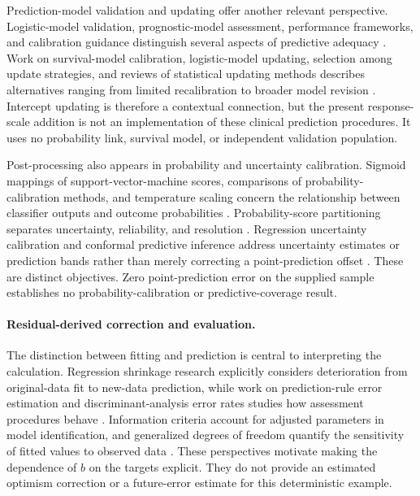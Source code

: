 \documentclass[11pt]{article}
\begin{document}
Prediction-model validation and updating offer another relevant perspective. Logistic-model validation, prognostic-model assessment, performance frameworks, and calibration guidance distinguish several aspects of predictive adequacy \cite{Miller1991ValidationTechniques,Harrell1996MultivariablePrognostic,Steyerberg2009AssessingPerformance,Initiative2019CalibrationAchilles}. Work on survival-model calibration, logistic-model updating, selection among update strategies, and reviews of statistical updating methods describes alternatives ranging from limited recalibration to broader model revision \cite{Houwelingen2000ValidationCalibration,Steyerberg2004ValidationUpdating,Vergouwe2016ClosedTesting,Su2016ReviewStatistical}. Intercept updating is therefore a contextual connection, but the present response-scale addition is not an implementation of these clinical prediction procedures. It uses no probability link, survival model, or independent validation population.

Post-processing also appears in probability and uncertainty calibration. Sigmoid mappings of support-vector-machine scores, comparisons of probability-calibration methods, and temperature scaling concern the relationship between classifier outputs and outcome probabilities \cite{Platt1999ProbabilisticOutputs,Niculescumizil2005PredictingGood,Guo2017CalibrationModern}. Probability-score partitioning separates uncertainty, reliability, and resolution \cite{Murphy1973NewVector}. Regression uncertainty calibration and conformal predictive inference address uncertainty estimates or prediction bands rather than merely correcting a point-prediction offset \cite{Kuleshov2018AccurateUncertainties,Levi2022EvaluatingCalibrating,Lei2018DistributionfreePredictive}. These are distinct objectives. Zero point-prediction error on the supplied sample establishes no probability-calibration or predictive-coverage result.

\paragraph{Residual-derived correction and evaluation.}
The distinction between fitting and prediction is central to interpreting the calculation. Regression shrinkage research explicitly considers deterioration from original-data fit to new-data prediction, while work on prediction-rule error estimation and discriminant-analysis error rates studies how assessment procedures behave \cite{Copas1983RegressionPrediction,Efron1983EstimatingError,Lachenbruch1968EstimationError}. Information criteria account for adjusted parameters in model identification, and generalized degrees of freedom quantify the sensitivity of fitted values to observed data \cite{Akaike1974NewLook,Ye1998MeasuringCorrecting}. These perspectives motivate making the dependence of $b$ on the targets explicit. They do not provide an estimated optimism correction or a future-error estimate for this deterministic example.
\end{document}
